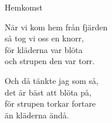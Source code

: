 \begin{song}{Hemkomst}

    	
	När vi kom hem från fjärden\\
	så tog vi oss en knorr,\\
	för kläderna var blöta\\
	och strupen den var torr.\\
	\begin{repetition}
		Och då tänkte jag som så,\\
		det är bäst att blöta på,\\
		för strupen torkar fortare\\
		än kläderna ändå.
	\end{repetition}
	
\end{song}

